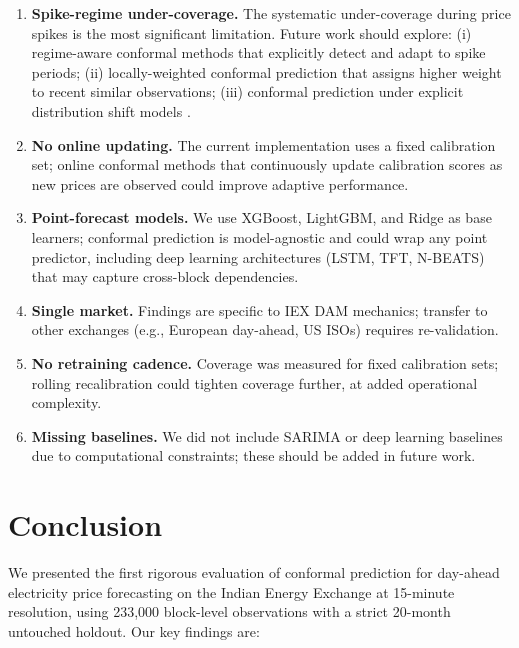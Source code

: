 \documentclass[preprint,12pt]{elsarticle}
\begin{document}
\begin{enumerate}
\begin{enumerate}
  \item \textbf{Spike-regime under-coverage.} The systematic under-coverage during price spikes is the most significant limitation. Future work should explore: (i) regime-aware conformal methods that explicitly detect and adapt to spike periods; (ii) locally-weighted conformal prediction that assigns higher weight to recent similar observations; (iii) conformal prediction under explicit distribution shift models \citep{barber2023}.
  \item \textbf{No online updating.} The current implementation uses a fixed calibration set; online conformal methods that continuously update calibration scores as new prices are observed could improve adaptive performance.
  \item \textbf{Point-forecast models.} We use XGBoost, LightGBM, and Ridge as base learners; conformal prediction is model-agnostic and could wrap any point predictor, including deep learning architectures (LSTM, TFT, N-BEATS) that may capture cross-block dependencies.
  \item \textbf{Single market.} Findings are specific to IEX DAM mechanics; transfer to other exchanges (e.g., European day-ahead, US ISOs) requires re-validation.
  \item \textbf{No retraining cadence.} Coverage was measured for fixed calibration sets; rolling recalibration could tighten coverage further, at added operational complexity.
  \item \textbf{Missing baselines.} We did not include SARIMA or deep learning baselines due to computational constraints; these should be added in future work.
\end{enumerate}

\section{Conclusion}\label{sec:conclusion}

We presented the first rigorous evaluation of conformal prediction for day-ahead electricity price forecasting on the Indian Energy Exchange at 15-minute resolution, using 233,000 block-level observations with a strict 20-month untouched holdout. Our key findings are:


\end{enumerate}
\end{document}
